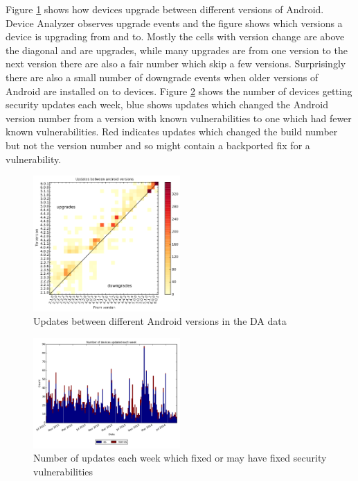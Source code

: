 \documentclass[a4paper,twocolumn]{article}
\begin{document}
Figure \ref{fig:from_to_updates} shows how devices upgrade between different versions of Android.
Device Analyzer observes upgrade events and the figure shows which versions a device is upgrading from and to.
Mostly the cells with version change are above the diagonal and are upgrades, while many upgrades are from one version to the next version there are also a fair number which skip a few versions.
Surprisingly there are also a small number of downgrade events when older versions of Android are installed on to devices.
Figure \ref{fig:weekly_security_updates} shows the number of devices getting security updates each week, blue shows updates which changed the Android version number from a version with known vulnerabilities to one which had fewer known vulnerabilities.
Red indicates updates which changed the build number but not the version number and so might contain a backported fix for a vulnerability.

\begin{figure}
 \includegraphics[width=0.5\textwidth]{figures/from_to_updates.pdf}
 \caption{Updates between different Android versions in the DA data}
 \label{fig:from_to_updates}
\end{figure}
\begin{figure}
 \includegraphics[width=0.5\textwidth]{figures/w_security_updates.pdf}
 \caption{Number of updates each week which fixed or may have fixed security vulnerabilities}
 \label{fig:weekly_security_updates}
\end{figure}
\end{document}
